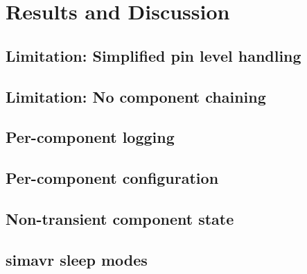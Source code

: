 
\chapter{Results and Discussion} \label{chapter:results}

\section{Limitation: Simplified pin level handling}


\section{Limitation: No component chaining}

\section{Per-component logging}
\section{Per-component configuration}


\section{Non-transient component state}


\section{simavr sleep modes}

